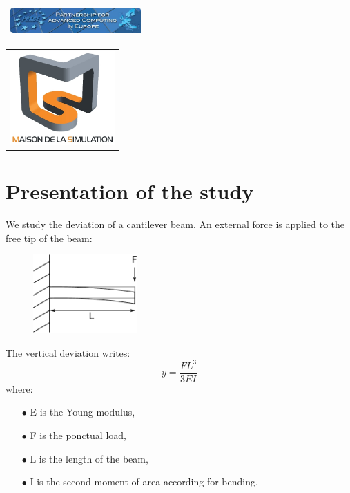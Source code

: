 \documentclass[11pt, french, A4wide]{article}
\theoremstyle{remark}
\theoremstyle{definition}
\begin{document}
\begin{minipage}{6cm}
  \begin{center}
    \begin{tabular}{c}
			\includegraphics[width=5cm]{Prace_long.jpg}
    \end{tabular}
  \end{center}
\end{minipage}
\hfill
\begin{minipage}{6cm}
  \begin{center}
    \begin{tabular}{c}
				\includegraphics[width=4cm]{logo_MDS.jpg}
    \end{tabular}
  \end{center}
\end{minipage}


\newpage
\section{Presentation of the study}

We study the deviation of a cantilever beam. An external force is applied to the free tip of the beam:

\begin{figure}[htbp]
\centering
\includegraphics[width=4cm]{poutre.pdf}
\end{figure}

The vertical deviation writes:
\begin{equation}\label{relBeam}
  y = \displaystyle \frac{FL^3}{3EI}
\end{equation}
 where:
\begin{itemize}
    \item[$\bullet$]  E is the Young modulus,
    \item[$\bullet$]  F is the ponctual load,
    \item[$\bullet$]  L is the length of the beam,
    \item[$\bullet$]  I is the second moment of area according for bending.
\end{itemize}
\vspace*{0.2cm}
\end{document}
